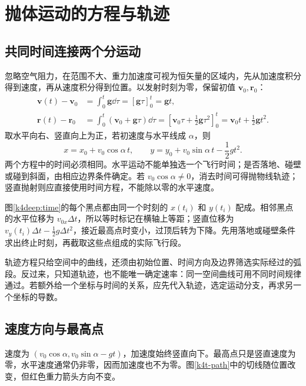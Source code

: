 \section{抛体运动的方程与轨迹}
\subsection{共同时间连接两个分运动}
忽略空气阻力，在范围不大、重力加速度可视为恒矢量的区域内，先从加速度积分得到速度，再从速度积分得到位置。以发射时刻为零，保留初值 $\bm v_0,\bm r_0$：
\begin{align*}
 \bm v(t)-\bm v_0&=\int_0^t\bm g\dd\tau
 =[\bm g\tau]_0^t=\bm gt,\\
 \bm r(t)-\bm r_0&=\int_0^t(\bm v_0+\bm g\tau)\dd\tau
 =\left[\bm v_0\tau+\frac12\bm g\tau^2\right]_0^t
 =\bm v_0t+\frac12\bm gt^2.
\end{align*}
取水平向右、竖直向上为正，若初速度与水平线成 $\alpha$，则
\[x=x_0+v_0\cos\alpha\,t,\qquad y=y_0+v_0\sin\alpha\,t-\frac12gt^2.\]
两个方程中的时间必须相同。水平运动不能单独选一个飞行时间；是否落地、碰壁或碰到斜面，由相应边界条件确定。若 $v_0\cos\alpha\ne0$，消去时间可得抛物线轨迹；竖直抛射则应直接使用时间方程，不能除以零的水平速度。

图\ref{k4deep:time}的每个黑点都由同一个时刻的 $x(t_i)$ 和 $y(t_i)$ 配成。相邻黑点的水平位移为 $v_{0x}\Delta t$，所以等时标记在横轴上等距；竖直位移为 $v_y(t_i)\Delta t-\tfrac12g\Delta t^2$，接近最高点时变小，过顶后转为下降。先用落地或碰壁条件求出终止时刻，再截取这些点组成的实际飞行段。

轨迹方程只给空间中的曲线，还须由初始位置、时间方向及边界筛选实际经过的弧段。反过来，只知道轨迹，也不能唯一确定速率：同一空间曲线可用不同时间规律通过。若额外给一个坐标与时间的关系，应先代入轨迹，选定运动分支，再求另一个坐标的导数。

\subsection{速度方向与最高点}
速度为 $(v_0\cos\alpha,v_0\sin\alpha-gt)$，加速度始终竖直向下。最高点只是竖直速度为零，水平速度通常仍非零，因而加速度也不为零。图\ref{k4t-path}中的切线随位置改变，但红色重力箭头方向不变。

